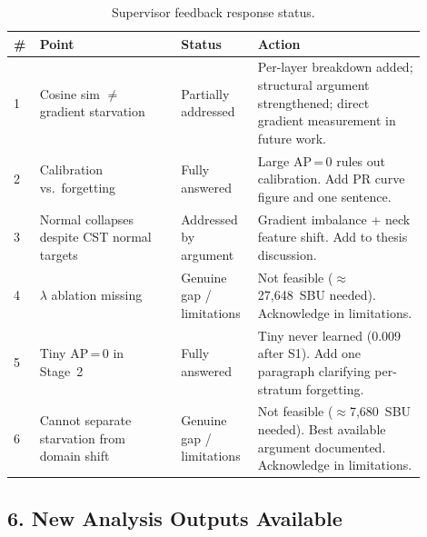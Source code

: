 \begin{table}[h]
\centering
\caption{Supervisor feedback response status.}
\small
\begin{tabular}{p{0.04\linewidth}p{0.32\linewidth}p{0.16\linewidth}p{0.38\linewidth}}
\hline
\textbf{\#} & \textbf{Point} & \textbf{Status} & \textbf{Action} \\
\hline
1 & Cosine sim $\neq$ gradient starvation &
    Partially addressed &
    Per-layer breakdown added; structural argument strengthened;
    direct gradient measurement in future work. \\[4pt]
2 & Calibration vs.\ forgetting &
    Fully answered &
    Large AP\,=\,0 rules out calibration.
    Add PR curve figure and one sentence. \\[4pt]
3 & Normal collapses despite CST normal targets &
    Addressed by argument &
    Gradient imbalance + neck feature shift.
    Add to thesis discussion. \\[4pt]
4 & $\lambda$ ablation missing &
    Genuine gap / limitations &
    Not feasible ($\approx$27,648~SBU needed).
    Acknowledge in limitations. \\[4pt]
5 & Tiny AP\,=\,0 in Stage~2 &
    Fully answered &
    Tiny never learned (0.009 after S1).
    Add one paragraph clarifying per-stratum forgetting. \\[4pt]
6 & Cannot separate starvation from domain shift &
    Genuine gap / limitations &
    Not feasible ($\approx$7,680~SBU needed).
    Best available argument documented. Acknowledge in limitations. \\
\hline
\end{tabular}
\end{table}

\subsection*{6. New Analysis Outputs Available}

